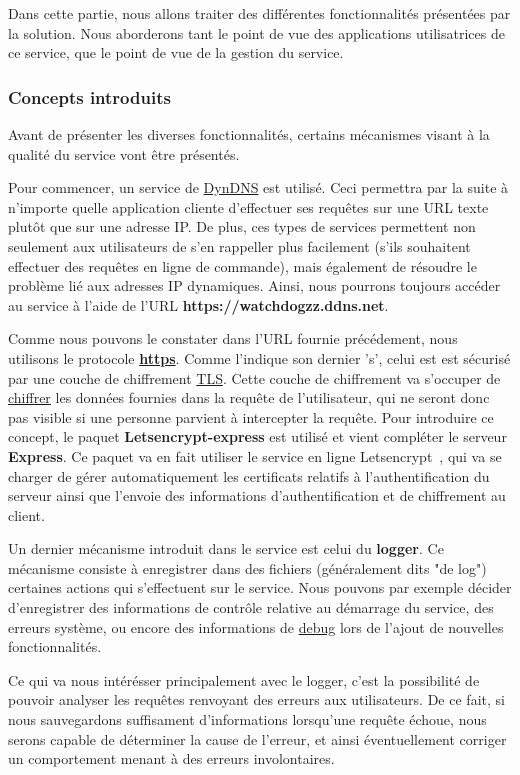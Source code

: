 Dans cette partie, nous allons traiter des différentes fonctionnalités présentées par la solution. Nous aborderons tant le point de vue des applications utilisatrices de ce service, que le point de vue de la gestion du service.

\subsubsection{Concepts introduits}

Avant de présenter les diverses fonctionnalités, certains mécanismes visant à la qualité du service vont être présentés.

Pour commencer, un service de \underline{DynDNS} est utilisé. Ceci permettra par la suite à n'importe quelle application cliente d'effectuer ses requêtes sur une URL texte plutôt que sur une adresse IP. De plus, ces types de services permettent non seulement aux utilisateurs de s'en rappeller plus facilement (s'ils souhaitent effectuer des requêtes en ligne de commande), mais également de résoudre le problème lié aux adresses IP dynamiques. Ainsi, nous pourrons toujours accéder au service à l'aide de l'URL \textbf{https://watchdogzz.ddns.net}.

Comme nous pouvons le constater dans l'URL fournie précédement, nous utilisons le protocole \textbf{\underline{https}}. Comme l'indique son dernier 's', celui est est sécurisé par une couche de chiffrement \underline{TLS}. Cette couche de chiffrement va s'occuper de \underline{chiffrer} les données fournies dans la requête de l'utilisateur, qui ne seront donc pas visible si une personne parvient à intercepter la requête.
Pour introduire ce concept, le paquet \textbf{Letsencrypt-express} est utilisé et vient compléter le serveur \textbf{Express}. Ce paquet va en fait utiliser le service en ligne Letsencrypt~\cite{letsencrypt}, qui va se charger de gérer automatiquement les certificats relatifs à l'authentification du serveur ainsi que l'envoie des informations d'authentification et de chiffrement au client.

Un dernier mécanisme introduit dans le service est celui du \textbf{logger}. Ce mécanisme consiste à enregistrer dans des fichiers (généralement dits "de log") certaines actions qui s'effectuent sur le service. Nous pouvons par exemple décider d'enregistrer des informations de contrôle relative au démarrage du service, des erreurs système, ou encore des informations de \underline{debug} lors de l'ajout de nouvelles fonctionnalités.

Ce qui va nous intérésser principalement avec le logger, c'est la possibilité de pouvoir analyser les requêtes renvoyant des erreurs aux utilisateurs.
De ce fait, si nous sauvegardons suffisament d'informations lorsqu'une requête échoue, nous serons capable de déterminer la cause de l'erreur, et ainsi éventuellement corriger un comportement menant à des erreurs involontaires.

